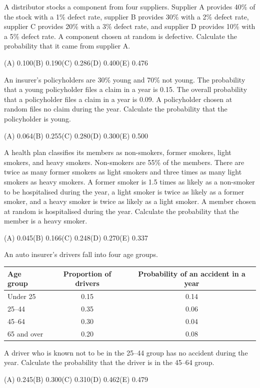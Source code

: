 \begin{practice}
A distributor stocks a component from four suppliers. Supplier A provides 40\% of the
stock with a 1\% defect rate, supplier B provides 30\% with a 2\% defect rate, supplier C
provides 20\% with a 3\% defect rate, and supplier D provides 10\% with a 5\% defect rate.
A component chosen at random is defective. Calculate the probability that it came from
supplier A.
\par\smallskip\noindent (A) 0.100\qquad (B) 0.190\qquad (C) 0.286\qquad (D) 0.400\qquad (E) 0.476
\end{practice}

\begin{practice}
An insurer's policyholders are 30\% young and 70\% not young. The probability that a young
policyholder files a claim in a year is 0.15. The overall probability that a policyholder
files a claim in a year is 0.09. A policyholder chosen at random files no claim during the
year. Calculate the probability that the policyholder is young.
\par\smallskip\noindent (A) 0.064\qquad (B) 0.255\qquad (C) 0.280\qquad (D) 0.300\qquad (E) 0.500
\end{practice}

\begin{practice}
A health plan classifies its members as non-smokers, former smokers, light smokers, and
heavy smokers. Non-smokers are 55\% of the members. There are twice as many former smokers
as light smokers and three times as many light smokers as heavy smokers. A former smoker is
1.5 times as likely as a non-smoker to be hospitalised during the year, a light smoker is
twice as likely as a former smoker, and a heavy smoker is twice as likely as a light smoker.
A member chosen at random is hospitalised during the year. Calculate the probability that
the member is a heavy smoker.
\par\smallskip\noindent (A) 0.045\qquad (B) 0.166\qquad (C) 0.248\qquad (D) 0.270\qquad (E) 0.337
\end{practice}

\begin{practice}
An auto insurer's drivers fall into four age groups.
\begin{center}
\begin{tabular}{@{}lcc@{}}
\toprule
Age group & Proportion of drivers & Probability of an accident in a year \\
\midrule
Under 25    & 0.15 & 0.14 \\
25--44      & 0.35 & 0.06 \\
45--64      & 0.30 & 0.04 \\
65 and over & 0.20 & 0.08 \\
\bottomrule
\end{tabular}
\end{center}
A driver who is known not to be in the 25--44 group has no accident during the year.
Calculate the probability that the driver is in the 45--64 group.
\par\smallskip\noindent (A) 0.245\qquad (B) 0.300\qquad (C) 0.310\qquad (D) 0.462\qquad (E) 0.479
\end{practice}

